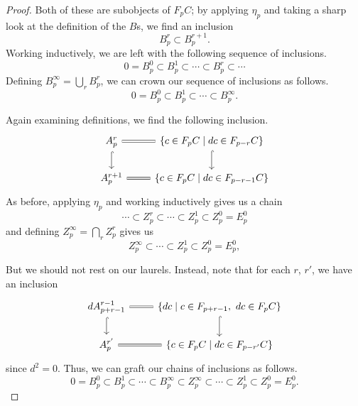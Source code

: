 \documentclass[main.tex]{subfiles}
\begin{document}
\begin{proof}
  Both of these are subobjects of $F_{p}C$; by applying $\eta_{p}$ and taking a sharp look at the definition of the $B$s, we find an inclusion
  \begin{equation*}
    B^{r}_{p} \subset B^{r+1}_{p}.
  \end{equation*}
  Working inductively, we are left with the following sequence of inclusions.
  \begin{equation*}
    0 = B^{0}_{p} \subset B^{1}_{p} \subset \cdots \subset B^{r}_{p} \subset \cdots
  \end{equation*}
  Defining $B^{\infty}_{p} = \bigcup_{r} B^{r}_{p}$, we can crown our sequence of inclusions as follows.
  \begin{equation*}
    0 = B^{0}_{p} \subset B^{1}_{p} \subset \cdots \subset B^{\infty}_{p}.
  \end{equation*}

  Again examining definitions, we find the following inclusion.
  \begin{equation*}
    \begin{tikzcd}
      A^{r}_{p}
      \arrow[r, equals]
      \arrow[d, hook]
      & \{c \in F_{p}C \mid dc \in F_{p-r}C\}
      \arrow[d, hook]
      \\
      A^{r+1}_{p}
      \arrow[r, equals]
      & \{c \in F_{p}C \mid dc \in F_{p-r-1}C\}
    \end{tikzcd}
  \end{equation*}
  As before, applying $\eta_{p}$ and working inductively gives us a chain
  \begin{equation*}
    \cdots \subset Z^{r}_{p} \subset \cdots \subset Z^{1}_{p} \subset Z^{0}_{p} = E^{0}_{p}
  \end{equation*}
  and defining $Z^{\infty}_{p} = \bigcap_{r} Z^{r}_{p}$ gives us
  \begin{equation*}
    Z^{\infty}_{p} \subset \cdots \subset Z^{1}_{p} \subset Z^{0}_{p} = E^{0}_{p},
  \end{equation*}

  But we should not rest on our laurels. Instead, note that for each $r$, $r'$, we have an inclusion
  \begin{equation*}
    \begin{tikzcd}
      dA^{r-1}_{p+r-1}
      \arrow[r, equals]
      \arrow[d, hook]
      & \{dc \mid c \in F_{p+r-1},\ dc \in F_{p}C\}
      \arrow[d, hook]
      \\
      A^{r'}_{p}
      \arrow[r, equals]
      & \{c \in F_{p}C \mid dc \in F_{p-r'}C\}
    \end{tikzcd}
  \end{equation*}
  since $d^{2} = 0$. Thus, we can graft our chains of inclusions as follows.
  \begin{equation*}
    0 = B^{0}_{p} \subset B^{1}_{p} \subset \cdots \subset B^{\infty}_{p} \subset Z^{\infty}_{p} \subset \cdots \subset Z^{1}_{p} \subset Z^{0}_{p} = E^{0}_{p}.
  \end{equation*}


\end{proof}
\end{document}
